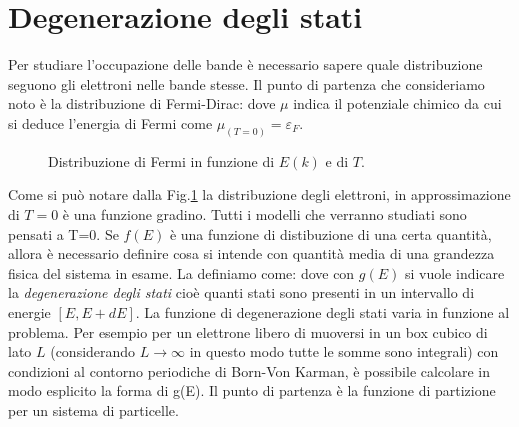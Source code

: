 \documentclass[a4paper,12pt]{article}
\begin{document}
\section{Degenerazione degli stati}
Per studiare l'occupazione delle bande è necessario sapere quale distribuzione seguono gli elettroni nelle bande stesse. Il punto di partenza che consideriamo noto è la distribuzione di Fermi-Dirac:
dove $\mu$ indica il potenziale chimico da cui si deduce l'energia di Fermi come $\mu_{(T=0)}=\varepsilon_F$.
\begin{figure}
	\centering
	\caption{Distribuzione di Fermi in funzione di $E(k)$ e di $T$.}
	\label{Fermi}
\end{figure}
Come si può notare dalla Fig.\ref{Fermi} la distribuzione degli elettroni, in approssimazione di $T=0$ è una funzione gradino. Tutti i modelli che verranno studiati sono pensati a T=0. Se $f(E)$ è una funzione di distibuzione di una certa quantità, allora è necessario definire cosa si intende con quantità media di una grandezza fisica del sistema in esame. La definiamo come:
dove con $g(E)$ si vuole indicare la \textit{degenerazione degli stati} cioè quanti stati sono presenti in un intervallo di energie $[E,E+dE]$. La funzione di degenerazione degli stati varia in funzione al problema. Per esempio per un elettrone libero di muoversi in un box cubico di lato $L$ (considerando $L\to\infty$ in questo modo tutte le somme sono integrali) con condizioni al contorno periodiche di Born-Von Karman, è possibile calcolare in modo esplicito la forma di g(E). Il punto di partenza è la funzione di partizione per un sistema di particelle. 
\end{document}
